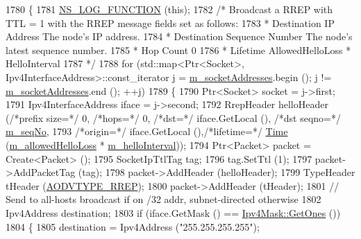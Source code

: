 \begin{DoxyCode}
1780 \{
1781   \hyperlink{log-macros-disabled_8h_a90b90d5bad1f39cb1b64923ea94c0761}{NS\_LOG\_FUNCTION} (\textcolor{keyword}{this});
1782   \textcolor{comment}{/* Broadcast a RREP with TTL = 1 with the RREP message fields set as follows:}
1783 \textcolor{comment}{   *   Destination IP Address         The node's IP address.}
1784 \textcolor{comment}{   *   Destination Sequence Number    The node's latest sequence number.}
1785 \textcolor{comment}{   *   Hop Count                      0}
1786 \textcolor{comment}{   *   Lifetime                       AllowedHelloLoss * HelloInterval}
1787 \textcolor{comment}{   */}
1788   \textcolor{keywordflow}{for} (std::map<Ptr<Socket>, Ipv4InterfaceAddress>::const\_iterator j = 
      \hyperlink{classns3_1_1aodv_1_1RoutingProtocol_aa3263563cbbd735faafbf17fd4e28a10}{m\_socketAddresses}.begin (); j != \hyperlink{classns3_1_1aodv_1_1RoutingProtocol_aa3263563cbbd735faafbf17fd4e28a10}{m\_socketAddresses}.end (); ++j)
1789     \{
1790       Ptr<Socket> socket = j->first;
1791       Ipv4InterfaceAddress iface = j->second;
1792       RrepHeader helloHeader (\textcolor{comment}{/*prefix size=*/} 0, \textcolor{comment}{/*hops=*/} 0, \textcolor{comment}{/*dst=*/} iface.GetLocal (), \textcolor{comment}{/*dst seqno=*/} 
      \hyperlink{classns3_1_1aodv_1_1RoutingProtocol_abf5ef6b30d0ccf20b9b5ecf7918f67b2}{m\_seqNo},
1793                                                \textcolor{comment}{/*origin=*/} iface.GetLocal (),\textcolor{comment}{/*lifetime=*/} 
      \hyperlink{namespacens3_1_1TracedValueCallback_a7ffd3e7c142ffe7c8a1d2db9b8de38ec}{Time} (\hyperlink{classns3_1_1aodv_1_1RoutingProtocol_a80e1dc9b9a640570ba5d5270846a2f6f}{m\_allowedHelloLoss} * \hyperlink{classns3_1_1aodv_1_1RoutingProtocol_aa9750612eb154b537b1d7d0350cb8912}{m\_helloInterval}));
1794       Ptr<Packet> packet = Create<Packet> ();
1795       SocketIpTtlTag tag;
1796       tag.SetTtl (1);
1797       packet->AddPacketTag (tag);
1798       packet->AddHeader (helloHeader);
1799       TypeHeader tHeader (\hyperlink{namespacens3_1_1aodv_a8cf417608302ba0ed75225c976944d44a034af3d66c569436a630b5ee35399e45}{AODVTYPE\_RREP});
1800       packet->AddHeader (tHeader);
1801       \textcolor{comment}{// Send to all-hosts broadcast if on /32 addr, subnet-directed otherwise}
1802       Ipv4Address destination;
1803       \textcolor{keywordflow}{if} (iface.GetMask () == \hyperlink{classns3_1_1Ipv4Mask_af712cbdf28c039025d4aa45fa7e243dd}{Ipv4Mask::GetOnes} ())
1804         \{
1805           destination = Ipv4Address (\textcolor{stringliteral}{"255.255.255.255"});

\end{DoxyCode}

